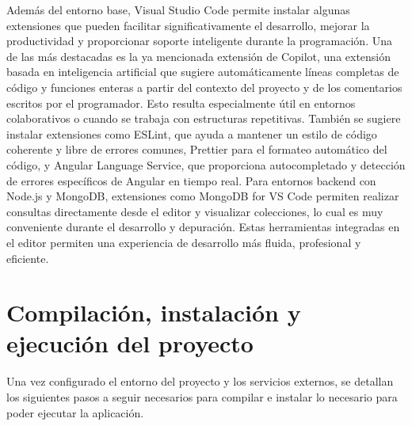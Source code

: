 Además del entorno base, Visual Studio Code permite instalar algunas extensiones que pueden facilitar significativamente el desarrollo, mejorar la productividad y proporcionar soporte inteligente durante la programación. Una de las más destacadas es la ya mencionada extensión de Copilot, una extensión basada en inteligencia artificial que sugiere automáticamente líneas completas de código y funciones enteras a partir del contexto del proyecto y de los comentarios escritos por el programador. Esto resulta especialmente útil en entornos colaborativos o cuando se trabaja con estructuras repetitivas. También se sugiere instalar extensiones como ESLint, que ayuda a mantener un estilo de código coherente y libre de errores comunes, Prettier para el formateo automático del código, y Angular Language Service, que proporciona autocompletado y detección de errores específicos de Angular en tiempo real. Para entornos backend con Node.js y MongoDB, extensiones como MongoDB for VS Code permiten realizar consultas directamente desde el editor y visualizar colecciones, lo cual es muy conveniente durante el desarrollo y depuración. Estas herramientas integradas en el editor permiten una experiencia de desarrollo más fluida, profesional y eficiente.

\section{Compilación, instalación y ejecución del proyecto}
\label{sec:compilacion}

Una vez configurado el entorno del proyecto y los servicios externos, se detallan los siguientes pasos a seguir necesarios para compilar e instalar lo necesario para poder ejecutar la aplicación.

